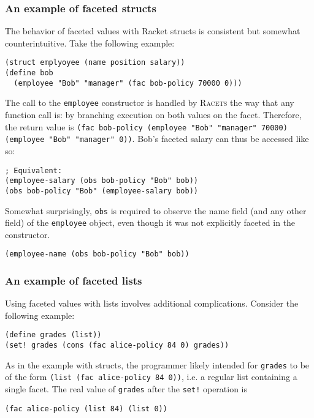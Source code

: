 \documentclass{article}
\begin{document}
\subsubsection{An example of faceted structs}
The behavior of faceted values with Racket structs is consistent but somewhat counterintuitive. Take the following example:

\begin{lstlisting}
(struct emplyoyee (name position salary))
(define bob
  (employee "Bob" "manager" (fac bob-policy 70000 0)))
\end{lstlisting}

The call to the \texttt{employee} constructor is handled by \textsc{Racets} the way that any function call is: by branching execution on both values on the facet. Therefore, the return value is \texttt{(fac bob-policy (employee "Bob" "manager" 70000) (employee "Bob" "manager" 0))}. Bob's faceted salary can thus be accessed like so:

\begin{lstlisting}
; Equivalent:
(employee-salary (obs bob-policy "Bob" bob))
(obs bob-policy "Bob" (employee-salary bob))
\end{lstlisting}

Somewhat surprisingly, \texttt{obs} is required to observe the name field (and any other field) of the \texttt{employee} object, even though it was not explicitly faceted in the constructor.

\begin{lstlisting}
(employee-name (obs bob-policy "Bob" bob))
\end{lstlisting}

\subsubsection{An example of faceted lists}
Using faceted values with lists involves additional complications. Consider the following example:

\begin{lstlisting}
(define grades (list))
(set! grades (cons (fac alice-policy 84 0) grades))
\end{lstlisting}

As in the example with structs, the programmer likely intended for \texttt{grades} to be of the form \texttt{(list (fac alice-policy 84 0))}, i.e. a regular list containing a single facet. The real value of \texttt{grades} after the \texttt{set!} operation is

\begin{lstlisting}
(fac alice-policy (list 84) (list 0))
\end{lstlisting}
\end{document}
